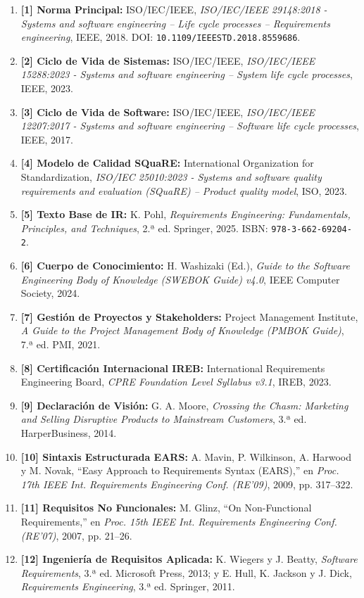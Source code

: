 \documentclass[conference,10pt]{IEEEtran}
\begin{document}
	\begin{enumerate}
		\item \textbf{[1] Norma Principal:} ISO/IEC/IEEE, \textit{ISO/IEC/IEEE 29148:2018 - Systems and software engineering -- Life cycle processes -- Requirements engineering}, IEEE, 2018. DOI: \texttt{10.1109/IEEESTD.2018.8559686}.
		\item \textbf{[2] Ciclo de Vida de Sistemas:} ISO/IEC/IEEE, \textit{ISO/IEC/IEEE 15288:2023 - Systems and software engineering -- System life cycle processes}, IEEE, 2023.
		\item \textbf{[3] Ciclo de Vida de Software:} ISO/IEC/IEEE, \textit{ISO/IEC/IEEE 12207:2017 - Systems and software engineering -- Software life cycle processes}, IEEE, 2017.
		\item \textbf{[4] Modelo de Calidad SQuaRE:} International Organization for Standardization, \textit{ISO/IEC 25010:2023 - Systems and software quality requirements and evaluation (SQuaRE) -- Product quality model}, ISO, 2023.
		\item \textbf{[5] Texto Base de IR:} K. Pohl, \textit{Requirements Engineering: Fundamentals, Principles, and Techniques}, 2.ª ed. Springer, 2025. ISBN: \texttt{978-3-662-69204-2}.
		\item \textbf{[6] Cuerpo de Conocimiento:} H. Washizaki (Ed.), \textit{Guide to the Software Engineering Body of Knowledge (SWEBOK Guide) v4.0}, IEEE Computer Society, 2024.
		\item \textbf{[7] Gestión de Proyectos y Stakeholders:} Project Management Institute, \textit{A Guide to the Project Management Body of Knowledge (PMBOK Guide)}, 7.ª ed. PMI, 2021.
		\item \textbf{[8] Certificación Internacional IREB:} International Requirements Engineering Board, \textit{CPRE Foundation Level Syllabus v3.1}, IREB, 2023.
		\item \textbf{[9] Declaración de Visión:} G. A. Moore, \textit{Crossing the Chasm: Marketing and Selling Disruptive Products to Mainstream Customers}, 3.ª ed. HarperBusiness, 2014.
		\item \textbf{[10] Sintaxis Estructurada EARS:} A. Mavin, P. Wilkinson, A. Harwood y M. Novak, ``Easy Approach to Requirements Syntax (EARS),'' en \textit{Proc. 17th IEEE Int. Requirements Engineering Conf. (RE'09)}, 2009, pp. 317--322.
		\item \textbf{[11] Requisitos No Funcionales:} M. Glinz, ``On Non-Functional Requirements,'' en \textit{Proc. 15th IEEE Int. Requirements Engineering Conf. (RE'07)}, 2007, pp. 21--26.
		\item \textbf{[12] Ingeniería de Requisitos Aplicada:} K. Wiegers y J. Beatty, \textit{Software Requirements}, 3.ª ed. Microsoft Press, 2013; y E. Hull, K. Jackson y J. Dick, \textit{Requirements Engineering}, 3.ª ed. Springer, 2011.
	\end{enumerate}
\end{document}
